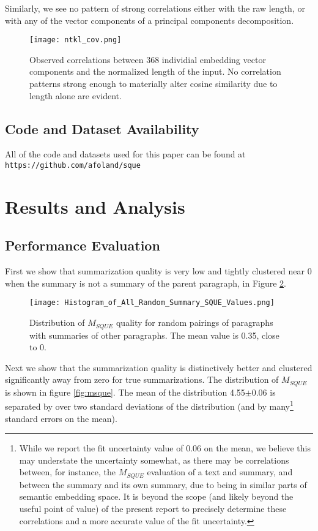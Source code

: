 \documentclass{article}
\begin{document}
{Similarly, we see no pattern of strong correlations either with the raw length, or with any of the vector components of a principal components decomposition.

\begin{figure}
	\centering
	\texttt{[image: ntkl\_cov.png]}
	\caption{Observed correlations between 368 individial embedding vector components and the normalized length of the input.  No correlation patterns strong enough to materially alter cosine similarity due to length alone are evident.}
	\label{fig:corrnormlength}
\end{figure}


\subsection{Code and Dataset Availability}
All of the code and datasets used for this paper can be found at \texttt{https://github.com/afoland/sque}

\section{Results and Analysis}

\subsection{Performance Evaluation}

First we show that summarization quality is very low and tightly clustered near 0 when the summary is not a summary of the parent paragraph, in Figure \ref{fig:msque_random}.

\begin{figure}
	\centering
	\texttt{[image: Histogram\_of\_All\_Random\_Summary\_SQUE\_Values.png]}
	\caption{Distribution of $M_{SQUE}$ quality for random pairings of paragraphs with summaries of other paragraphs.  The mean value is 0.35, close to 0.}
	\label{fig:msque_random}
\end{figure}

Next we show that the summarization quality is distinctively better and clustered significantly away from zero for true summarizations.
The distribution of $M_{SQUE}$ is shown in figure \ref{fig:msque}.
The mean of the distribution 4.55$\pm$0.06 is separated by over two standard deviations of the distribution (and by many\footnote{While we report the fit uncertainty value of 0.06 on the mean, we believe this may understate the uncertainty somewhat, as there may be correlations between, for instance, the $M_{SQUE}$ evaluation of a text and summary, and between the summary and its own summary, due to being in similar parts of semantic embedding space. It is beyond the scope (and likely beyond the useful point of value) of the present report to precisely determine these correlations and a more accurate value of the fit uncertainty.} standard errors on the mean).

}
\end{document}
